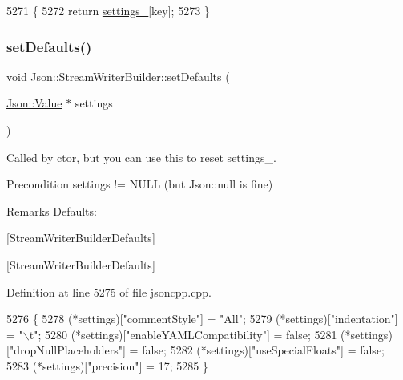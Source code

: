\begin{DoxyCode}
5271 \{
5272   \textcolor{keywordflow}{return} \hyperlink{class_json_1_1_stream_writer_builder_a79bdf2e639a52f4e758c0b95bd1d3423}{settings\_}[key];
5273 \}
\end{DoxyCode}
\mbox{\label{class_json_1_1_stream_writer_builder_a53bf106b141e28637b01ad0ecd2acbf6}} 
\subsubsection{\texorpdfstring{set\+Defaults()}{setDefaults()}}
{\footnotesize\ttfamily void Json\+::\+Stream\+Writer\+Builder\+::set\+Defaults (\begin{DoxyParamCaption}\item[{\hyperlink{class_json_1_1_value}{Json\+::\+Value} $\ast$}]{settings }\end{DoxyParamCaption})\hspace{0.3cm}{\ttfamily [static]}}

Called by ctor, but you can use this to reset settings\+\_\+. \begin{DoxyPrecond}{Precondition}
\textquotesingle{}settings\textquotesingle{} != N\+U\+LL (but Json\+::null is fine) 
\end{DoxyPrecond}
\begin{DoxyRemark}{Remarks}
Defaults\+: 
\begin{DoxyCodeInclude}
\end{DoxyCodeInclude}

\end{DoxyRemark}
\mbox{[}Stream\+Writer\+Builder\+Defaults\mbox{]}

\mbox{[}Stream\+Writer\+Builder\+Defaults\mbox{]} 

Definition at line 5275 of file jsoncpp.\+cpp.


\begin{DoxyCode}
5276 \{
5278   (*settings)[\textcolor{stringliteral}{"commentStyle"}] = \textcolor{stringliteral}{"All"};
5279   (*settings)[\textcolor{stringliteral}{"indentation"}] = \textcolor{stringliteral}{"\(\backslash\)t"};
5280   (*settings)[\textcolor{stringliteral}{"enableYAMLCompatibility"}] = \textcolor{keyword}{false};
5281   (*settings)[\textcolor{stringliteral}{"dropNullPlaceholders"}] = \textcolor{keyword}{false};
5282   (*settings)[\textcolor{stringliteral}{"useSpecialFloats"}] = \textcolor{keyword}{false};
5283   (*settings)[\textcolor{stringliteral}{"precision"}] = 17;
5285 \}
\end{DoxyCode}
\mbox{\label{class_json_1_1_stream_writer_builder_a12353b97766841db7d049da84658da09}} 
